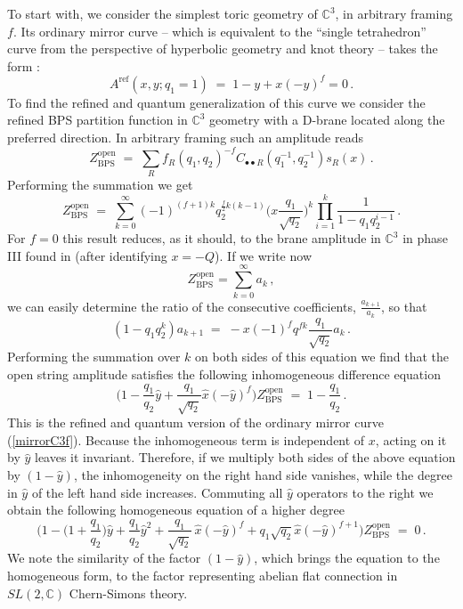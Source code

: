 \documentclass[hyper,letterpaper]{JHEP3}
\newcommand{\be}{\begin{equation}}
\newcommand{\ee}{\end{equation}}
\newcommand{\C}{{\mathbb C}}
\renewcommand{\hat}{\widehat}
\begin{document}
To start with, we consider the simplest toric geometry of $\C^3$, in arbitrary framing $f$.
Its ordinary mirror curve -- which is equivalent to the ``single tetrahedron'' curve from the perspective of hyperbolic geometry and knot theory -- takes the form \cite{abmodel}:
\be
A^{\text{ref}} (x,y; q_1=1) \; = \; 1 - y + x(-y)^f = 0 \,.    \label{mirrorC3f}
\ee
To find the refined and quantum generalization of this curve we consider
the refined BPS partition function in $\C^3$ geometry with a D-brane located along the preferred direction.
In arbitrary framing such an amplitude reads
\be
Z_{\text{BPS}}^{\text{open}} \; = \; \sum_R   f_R(q_1,q_2)^{-f} C_{\bullet\bullet R}(q_1^{-1},q_2^{-1}) s_R(x) \,.
\ee
Performing the summation we get
\be
Z_{\text{BPS}}^{\text{open}} \; = \; \sum_{k=0}^{\infty} (-1)^{(f+1)k} q_2^{\frac{f}{2}k(k-1)} \Big(x \frac{q_1}{\sqrt{q_2}}\Big)^k \prod_{i=1}^k \frac{1}{1 - q_1 q_2^{i-1}} \,.     \label{Zopen-BPS-C3}
\ee
For $f=0$ this result reduces, as it should, to the brane amplitude in $\C^3$ in phase III found in \cite{Iqbal:2007ii} (after identifying $x=-Q$).
If we write now
$$
Z_{\text{BPS}}^{\text{open}} = \sum_{k=0}^{\infty} a_k \,,
$$
we can easily determine the ratio of the consecutive coefficients, $\frac{a_{k+1}}{a_k}$, so that
\be
(1 - q_1 q_2^k) a_{k+1} \; = \; -x (-1)^f q^{fk} \frac{q_1}{\sqrt{q_2}} a_k \,.
\ee
Performing the summation over $k$ on both sides of this equation
we find that the open string amplitude satisfies the following inhomogeneous difference equation
\be
\Big(1 - \frac{q_1}{q_2} \hat{y} + \frac{q_1}{\sqrt{q_2}} \hat{x}(-\hat{y})^f   \Big) Z_{\text{BPS}}^{\text{open}} \; = \; 1 - \frac{q_1}{q_2} \,.
\label{AquantumC3inhom}
\ee
This is the refined and quantum version of the ordinary mirror curve (\ref{mirrorC3f}). Because the inhomogeneous term is independent of $x$, acting on it by $\hat{y}$ leaves it invariant. Therefore, if we multiply both sides of the above equation by $(1-\hat{y})$, the inhomogeneity on the right hand side vanishes, while the degree in $\hat{y}$ of the left hand side increases. Commuting all $\hat{y}$ operators to the right we obtain the following homogeneous equation of a higher degree
\be
\Big(1 - \Big(1 + \frac{q_1}{q_2}\Big) \hat{y} + \frac{q_1}{q_2}\hat{y}^2 +
\frac{q_1}{\sqrt{q_2}} \, \hat{x}(-\hat{y})^f + q_1\sqrt{q_2} \hat{x} (-\hat{y})^{f+1}
  \Big) Z_{\text{BPS}}^{\text{open}} \; = \; 0 \,.
\ee
We note the similarity of the factor $(1-\hat{y})$,
which brings the equation to the homogeneous form,
to the factor representing abelian flat connection in $SL(2,\C)$ Chern-Simons theory.
\end{document}
